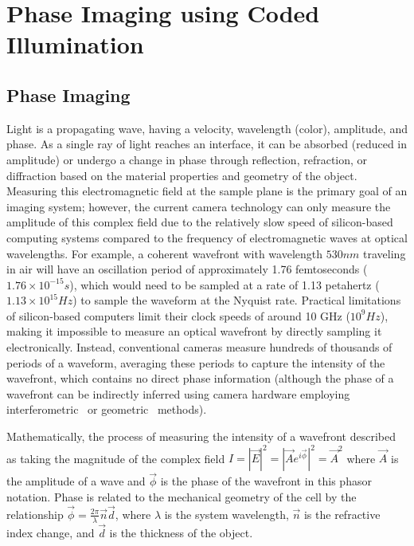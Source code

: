 \chapter{Phase Imaging using Coded Illumination}\label{ch:phase}

\section{Phase Imaging}
Light is a propagating wave, having a velocity, wavelength (color), amplitude, and phase. As a single ray of light reaches an interface, it can be absorbed (reduced in amplitude) or undergo a change in phase through reflection, refraction, or diffraction based on the material properties and geometry of the object. Measuring this electromagnetic field at the sample plane is the primary goal of an imaging system; however, the current camera technology can only measure the amplitude of this complex field due to the relatively slow speed of silicon-based computing systems compared to the frequency of electromagnetic waves at optical wavelengths. For example, a coherent wavefront with wavelength $530nm$ traveling in air will have an oscillation period of approximately 1.76 femtoseconds ($1.76 \times 10^{-15} s$), which would need to be sampled at a rate of 1.13 petahertz ($1.13 \times 10^{15} Hz$) to sample the waveform at the Nyquist rate. Practical limitations of silicon-based computers limit their clock speeds of around 10 GHz ($10^9 Hz$), making it impossible to measure an optical wavefront by directly sampling it electronically. Instead, conventional cameras measure hundreds of thousands of periods of a waveform, averaging these periods to capture the intensity of the wavefront, which contains no direct phase information (although the phase of a wavefront can be indirectly inferred using camera hardware employing interferometric~\cite{phasics, platt2001history} or geometric~\cite{Ng2005} methods).

Mathematically, the process of measuring the intensity of a wavefront described as taking the magnitude of the complex field $I =|\vec{E}|^2 =|\vec{A}e^{i\vec{\phi}}|^2 = \vec{A}^2$ where $\vec{A}$ is the amplitude of a wave and $\vec{\phi}$ is the phase of the wavefront in this phasor notation. Phase is related to the mechanical geometry of the cell by the relationship $\vec{\phi} = \frac{2\pi}{\lambda} \vec{n} \vec{d}$, where $\lambda$ is the system wavelength, $\vec{n}$ is the refractive index change, and $\vec{d}$ is the thickness of the object.

